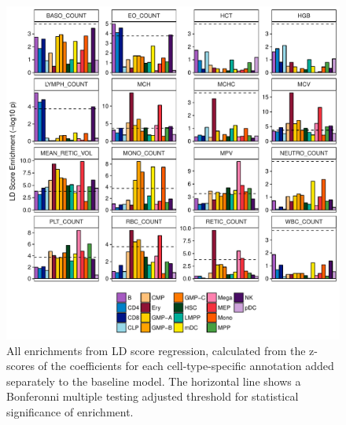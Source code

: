 \documentclass{article}\usepackage[]{graphicx}\usepackage[]{color}
\makeatletter
\def\maxwidth{ %
  \ifdim\Gin@nat@width>\linewidth
    \linewidth
  \else
    \Gin@nat@width
  \fi
}
\newenvironment{knitrout}{}{} %
\makeatother
\begin{document}
\begin{knitrout}
\color{fgcolor}\begin{figure}[H]

{\centering \includegraphics[width=\maxwidth]{figure/allLDscore-1} 

}

\caption[All enrichments from LD score regression, calculated from the z-scores of the coefficients for each cell-type-specific annotation added separately to the baseline model]{All enrichments from LD score regression, calculated from the z-scores of the coefficients for each cell-type-specific annotation added separately to the baseline model. The horizontal line shows a Bonferonni multiple testing adjusted threshold for statistical significance of enrichment.}\label{fig:allLDscore}
\end{figure}


\end{knitrout}
\end{document}
